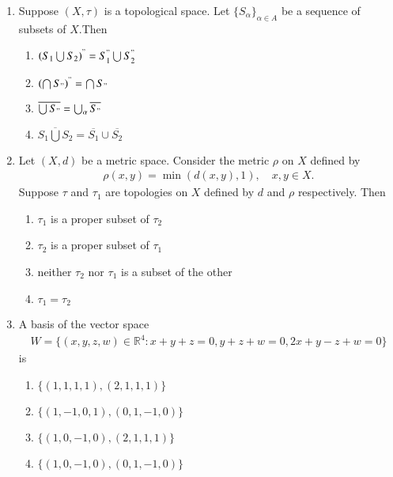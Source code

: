 \documentclass[journal]{IEEEtran}
\numberwithin{equation}{enumi}
\numberwithin{figure}{enumi}
\begin{document}
\begin{enumerate}
\item Suppose $(X, \tau)$ is a topological space. Let $\{S_\alpha\}_{\alpha \in A}$ be a sequence of subsets of $X$.\newline Then \hfill{}

\begin{enumerate}
    \item $\left(S_1\bigcup S_2\right)^" = S_1^" \bigcup S_2^" $
    \item $\left(\bigcap S_"\right)^" = \bigcap S_"$
    \item $\overline{\bigcup S_"} = \bigcup_\alpha \overline{S_"}$
    \item $\overline{S_1\bigcup S_2} = \overline{S_1} \cup \overline{S_2}$
\end{enumerate}


\item Let $(X, d)$ be a metric space. Consider the metric $\rho$ on $X$ defined by
\begin{align*}
\rho(x,y) = \min(d(x,y), 1), \quad x,y \in X.
\end{align*}
Suppose $\tau$ and $\tau_1$ are topologies on $X$ defined by $d$ and $\rho$ respectively. Then
\hfill{}

\begin{enumerate}
    \item $\tau_1$ is a proper subset of $\tau_2$
    \item $\tau_2$ is a proper subset of $\tau_1$
    \item neither $\tau_2$ nor $\tau_1$ is a subset of the other
    \item $\tau_1 = \tau_2$
\end{enumerate}



\item A basis of the vector space 
\begin{align*}
W = \{(x,y,z,w) \in \mathbb{R}^4 : x + y + z = 0, y + z + w = 0, 2x + y - z + w = 0\}
\end{align*}
is  \hfill{}
\begin{enumerate}
    \item $\{(1,1,1,1), (2,1,1,1)\}$
    \item $\{(1,-1,0,1), (0,1,-1,0)\}$
    \item $\{(1,0,-1,0), (2,1,1,1)\}$
    \item $\{(1,0,-1,0), (0,1,-1,0)\}$
\end{enumerate}



\end{enumerate}
\end{document}

